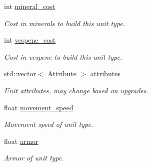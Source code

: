 \begin{DoxyCompactItemize}
int \hyperlink{structsc2_1_1_unit_type_data_a50b767a68415cb1acbf246ee7f52ddcb}{mineral\+\_\+cost}
\begin{DoxyCompactList}\small\item\em Cost in minerals to build this unit type. \end{DoxyCompactList}\item 
\mbox{\label{structsc2_1_1_unit_type_data_af596e50795f2b903b633cc7a72d43ae5}} 
int \hyperlink{structsc2_1_1_unit_type_data_af596e50795f2b903b633cc7a72d43ae5}{vespene\+\_\+cost}
\begin{DoxyCompactList}\small\item\em Cost in vespene to build this unit type. \end{DoxyCompactList}\item 
\mbox{\label{structsc2_1_1_unit_type_data_a1a07aba0d860ed9439104895ef2fc1f9}} 
std\+::vector$<$ Attribute $>$ \hyperlink{structsc2_1_1_unit_type_data_a1a07aba0d860ed9439104895ef2fc1f9}{attributes}
\begin{DoxyCompactList}\small\item\em \hyperlink{classsc2_1_1_unit}{Unit} attributes, may change based on upgrades. \end{DoxyCompactList}\item 
\mbox{\label{structsc2_1_1_unit_type_data_ac26ad858a8101e13d323c4111df9700b}} 
float \hyperlink{structsc2_1_1_unit_type_data_ac26ad858a8101e13d323c4111df9700b}{movement\+\_\+speed}
\begin{DoxyCompactList}\small\item\em Movement speed of unit type. \end{DoxyCompactList}\item 
\mbox{\label{structsc2_1_1_unit_type_data_afadeb2efc945bac24492cd4efd0dba28}} 
float \hyperlink{structsc2_1_1_unit_type_data_afadeb2efc945bac24492cd4efd0dba28}{armor}
\begin{DoxyCompactList}\small\item\em Armor of unit type. \end{DoxyCompactList}\item 
\mbox{\label{structsc2_1_1_unit_type_data_aad375db4df763eafc47589a1b20c8553}} 

\end{DoxyCompactItemize}
